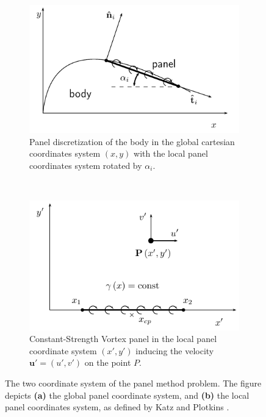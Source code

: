 	\begin{figure}[t]
        \centering
        \begin{subfigure}[b]{0.5\textwidth}
                \includegraphics[width=\textwidth]{figures/lagrangian/panelCoordinateDefinition.pdf}
                \caption{Panel discretization of the body in the global cartesian coordinates system $\left(x,y\right)$ with the local panel coordinates system rotated by $\alpha_i$.}
                \label{fig:panelCoordinateDefinition}
        \end{subfigure}%
        ~ %
        \begin{subfigure}[b]{0.5\textwidth}
                \includegraphics[width=\textwidth]{figures/lagrangian/vortexPanelDefinition.pdf}
                \caption{Constant-Strength Vortex panel in the local panel coordinate system $\left(x',y'\right)$ inducing the velocity $\mathbf{u}'=(u',v')$ on the point $P$.}
                \label{fig:vortexPanelDefinition}
        \end{subfigure}
        \caption{The two coordinate system of the panel method problem. The figure depicts \textbf{(a)} the global panel coordinate system, and \textbf{(b)} the local panel coordinates system, as defined by Katz and Plotkins \cite{Katz2001a}.}
        \label{fig:panelDefinitions}
	\end{figure}	
	
